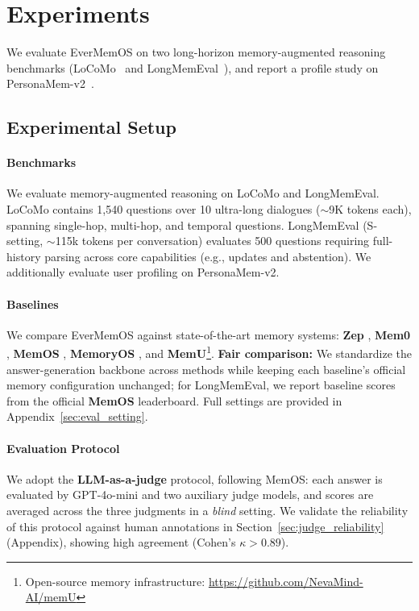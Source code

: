 \section{Experiments}
We evaluate EverMemOS on two long-horizon memory-augmented reasoning benchmarks (LoCoMo~\cite{maharana2024locomo} and LongMemEval~\cite{wu2025long}), and report a profile study on PersonaMem-v2~\cite{jiang2025personamem}.

\subsection{Experimental Setup}

\paragraph{Benchmarks}
We evaluate memory-augmented reasoning on LoCoMo and LongMemEval. LoCoMo contains 1{,}540 questions over 10 ultra-long dialogues ($\sim$9K tokens each), spanning single-hop, multi-hop, and temporal questions. LongMemEval (S-setting, $\sim$115k tokens per conversation) evaluates 500 questions requiring full-history parsing across core capabilities (e.g., updates and abstention). We additionally evaluate user profiling on PersonaMem-v2.

\paragraph{Baselines}
We compare EverMemOS against state-of-the-art memory systems: \textbf{Zep} \cite{zep2025}, \textbf{Mem0} \cite{mem02025}, \textbf{MemOS} \cite{li2025memos}, \textbf{MemoryOS} \cite{kang2025memory}, and \textbf{MemU}\footnote{Open-source memory infrastructure: \url{https://github.com/NevaMind-AI/memU}}.
\textbf{Fair comparison:} We standardize the answer-generation backbone across methods while keeping each baseline's official memory configuration unchanged; for LongMemEval, we report baseline scores from the official \textbf{MemOS} leaderboard. Full settings are provided in Appendix~\ref{sec:eval_setting}.

\paragraph{Evaluation Protocol}
We adopt the \textbf{LLM-as-a-judge} protocol, following MemOS: each answer is evaluated by GPT-4o-mini and two auxiliary judge models, and scores are averaged across the three judgments in a \emph{blind} setting. We validate the reliability of this protocol against human annotations in Section~\ref{sec:judge_reliability} (Appendix), showing high agreement (Cohen's $\kappa > 0.89$).


